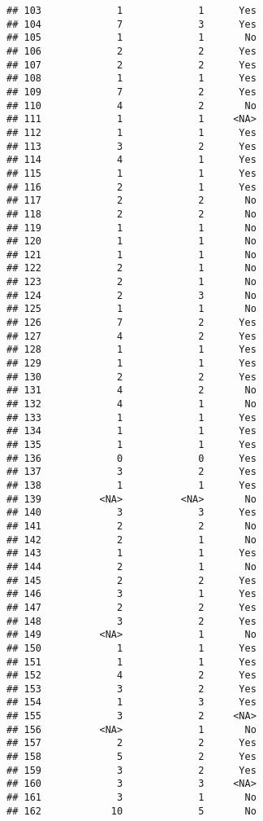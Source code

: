 \documentclass[
]{article}
\begin{document}
\begin{verbatim}
## 103             1             1      Yes
## 104             7             3      Yes
## 105             1             1       No
## 106             2             2      Yes
## 107             2             2      Yes
## 108             1             1      Yes
## 109             7             2      Yes
## 110             4             2       No
## 111             1             1     <NA>
## 112             1             1      Yes
## 113             3             2      Yes
## 114             4             1      Yes
## 115             1             1      Yes
## 116             2             1      Yes
## 117             2             2       No
## 118             2             2       No
## 119             1             1       No
## 120             1             1       No
## 121             1             1       No
## 122             2             1       No
## 123             2             1       No
## 124             2             3       No
## 125             1             1       No
## 126             7             2      Yes
## 127             4             2      Yes
## 128             1             1      Yes
## 129             1             1      Yes
## 130             2             2      Yes
## 131             4             2       No
## 132             4             1       No
## 133             1             1      Yes
## 134             1             1      Yes
## 135             1             1      Yes
## 136             0             0      Yes
## 137             3             2      Yes
## 138             1             1      Yes
## 139          <NA>          <NA>       No
## 140             3             3      Yes
## 141             2             2       No
## 142             2             1       No
## 143             1             1      Yes
## 144             2             1       No
## 145             2             2      Yes
## 146             3             1      Yes
## 147             2             2      Yes
## 148             3             2      Yes
## 149          <NA>             1       No
## 150             1             1      Yes
## 151             1             1      Yes
## 152             4             2      Yes
## 153             3             2      Yes
## 154             1             3      Yes
## 155             3             2     <NA>
## 156          <NA>             1       No
## 157             2             2      Yes
## 158             5             2      Yes
## 159             3             2      Yes
## 160             3             3     <NA>
## 161             3             1       No
## 162            10             5       No

\end{verbatim}
\end{document}
